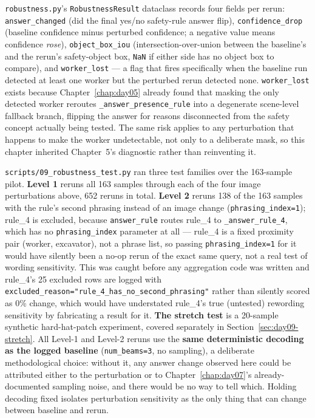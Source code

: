 \texttt{robustness.py}'s \texttt{RobustnessResult} dataclass records four fields per rerun:
\texttt{answer\_changed} (did the final yes/no safety-rule answer flip), \texttt{confidence\_drop}
(baseline confidence minus perturbed confidence; a negative value means confidence \emph{rose}),
\texttt{object\_box\_iou} (intersection-over-union between the baseline's and the rerun's safety-object
box, \texttt{NaN} if either side has no object box to compare), and \texttt{worker\_lost} --- a flag
that fires specifically when the baseline run detected at least one worker but the perturbed rerun
detected none. \texttt{worker\_lost} exists because Chapter~\ref{chap:day05} already found that
masking the only detected worker reroutes \texttt{\_answer\_presence\_rule} into a degenerate
scene-level fallback branch, flipping the answer for reasons disconnected from the safety concept
actually being tested. The same risk applies to any perturbation that happens to make the worker
undetectable, not only to a deliberate mask, so this chapter inherited Chapter~5's diagnostic rather
than reinventing it.

\texttt{scripts/09\_robustness\_test.py} ran three test families over the 163-sample pilot. \textbf{Level
1} reruns all 163 samples through each of the four image perturbations above, 652 reruns in total.
\textbf{Level 2} reruns 138 of the 163 samples with the rule's second phrasing instead of an image
change (\texttt{phrasing\_index=1}); rule\_4 is excluded, because \texttt{answer\_rule} routes rule\_4
to \texttt{\_answer\_rule\_4}, which has no \texttt{phrasing\_index} parameter at all --- rule\_4 is a
fixed proximity pair (worker, excavator), not a phrase list, so passing \texttt{phrasing\_index=1} for
it would have silently been a no-op rerun of the exact same query, not a real test of wording
sensitivity. This was caught before any aggregation code was written and rule\_4's 25 excluded rows
are logged with \texttt{excluded\_reason="rule\_4\_has\_no\_second\_phrasing"} rather than silently
scored as 0\% change, which would have understated rule\_4's true (untested) rewording sensitivity by
fabricating a result for it. \textbf{The stretch test} is a 20-sample synthetic hard-hat-patch
experiment, covered separately in Section~\ref{sec:day09-stretch}. All Level-1 and Level-2 reruns use
the \textbf{same deterministic decoding as the logged baseline} (\texttt{num\_beams=3}, no sampling),
a deliberate methodological choice: without it, any answer change observed here could be attributed
either to the perturbation or to Chapter~\ref{chap:day07}'s already-documented sampling noise, and
there would be no way to tell which. Holding decoding fixed isolates perturbation sensitivity as the
only thing that can change between baseline and rerun.

